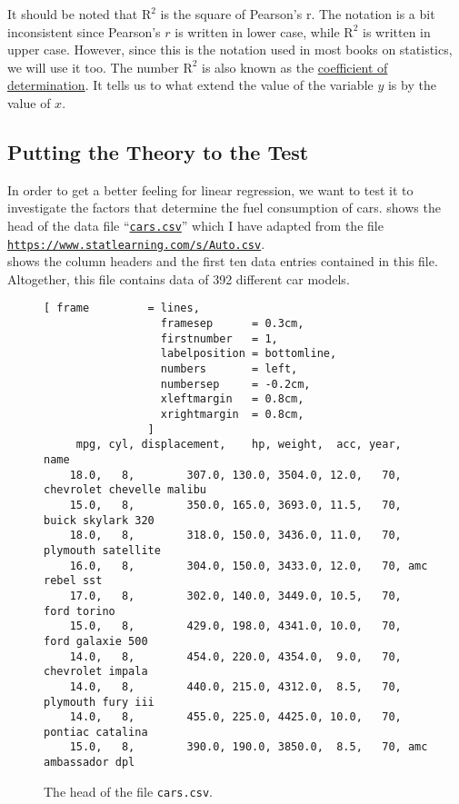 It should be noted that $\mathrm{R}^2$ is the square of Pearson's \textrm{r}.  The notation is a bit
inconsistent since Pearson's $r$ is written in lower case, while $\mathrm{R}^2$ is written in upper
case.  However, since this is the notation used in most books on statistics, we will use it too.
The number $\mathrm{R}^2$ is also known as the
\href{https://en.wikipedia.org/wiki/Coefficient_of_determination}{coefficient of determination}.  It tells us 
to what extend the value of the variable $y$ is  by the value of $x$.


\subsection{Putting the Theory to the Test}
In order to get a better feeling for linear regression, we want to test it to investigate the factors that
determine the fuel consumption of cars.   shows the head of the data file 
``\href{https://github.com/karlstroetmann/Artificial-Intelligence/blob/master/SetlX/cars.csv}{\texttt{cars.csv}}''
which I have adapted from the file
\\[0.2cm]
\hspace*{1.3cm}
\href{https://www.statlearning.com/s/Auto.csv}{\texttt{https://www.statlearning.com/s/Auto.csv}}.
\\[0.2cm]
 shows the column headers and the first ten data entries contained in this file.  
Altogether, this file contains data of 392 different car models.

\begin{figure}[!ht]
\centering
\begin{Verbatim}[ frame         = lines, 
                  framesep      = 0.3cm, 
                  firstnumber   = 1,
                  labelposition = bottomline,
                  numbers       = left,
                  numbersep     = -0.2cm,
                  xleftmargin   = 0.8cm,
                  xrightmargin  = 0.8cm,
                ]
     mpg, cyl, displacement,    hp, weight,  acc, year, name
    18.0,   8,        307.0, 130.0, 3504.0, 12.0,   70, chevrolet chevelle malibu
    15.0,   8,        350.0, 165.0, 3693.0, 11.5,   70, buick skylark 320
    18.0,   8,        318.0, 150.0, 3436.0, 11.0,   70, plymouth satellite
    16.0,   8,        304.0, 150.0, 3433.0, 12.0,   70, amc rebel sst
    17.0,   8,        302.0, 140.0, 3449.0, 10.5,   70, ford torino
    15.0,   8,        429.0, 198.0, 4341.0, 10.0,   70, ford galaxie 500
    14.0,   8,        454.0, 220.0, 4354.0,  9.0,   70, chevrolet impala
    14.0,   8,        440.0, 215.0, 4312.0,  8.5,   70, plymouth fury iii
    14.0,   8,        455.0, 225.0, 4425.0, 10.0,   70, pontiac catalina
    15.0,   8,        390.0, 190.0, 3850.0,  8.5,   70, amc ambassador dpl
\end{Verbatim}
\vspace*{-0.3cm}
\caption{The head of the file \texttt{cars.csv}.}
\label{fig:cars.csv}
\end{figure}

